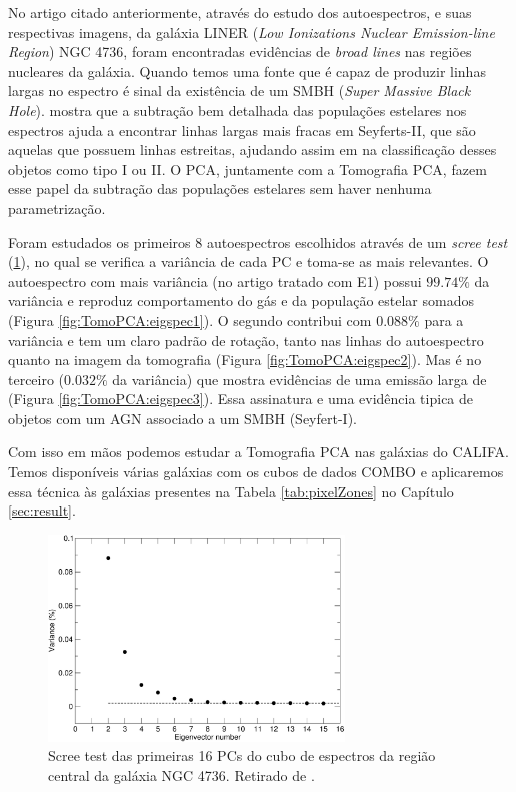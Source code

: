 No artigo citado anteriormente, através do estudo dos autoespectros, e suas
respectivas imagens, da galáxia LINER ({\em Low Ionizations Nuclear
Emission-line Region}) NGC 4736, foram encontradas evidências de {\em broad
lines} nas regiões nucleares da galáxia. Quando temos uma fonte que é capaz de
produzir linhas largas no espectro é sinal da existência de um SMBH ({\em Super
Massive Black Hole}). \citet{CidFernandes2004} mostra que a subtração bem
detalhada das populações estelares nos espectros ajuda a encontrar linhas largas
mais fracas em Seyferts-II, que são aquelas que possuem linhas estreitas,
ajudando assim em na classificação desses objetos como tipo I ou II. O PCA,
juntamente com a Tomografia PCA, fazem esse papel da subtração das populações
estelares sem haver nenhuma parametrização.

Foram estudados os primeiros 8 autoespectros escolhidos através de um {\em scree
test} (\ref{fig:TomoPCA:scree}), no qual se verifica a variância de cada PC e
toma-se as mais relevantes. O autoespectro com mais variância (no artigo tratado
com E1) possui $99.74\%$ da variância e reproduz comportamento do gás e da
população estelar somados (Figura \ref{fig:TomoPCA:eigspec1}). O segundo
contribui com $0.088\%$ para a variância e tem um claro padrão de rotação, tanto
nas linhas do autoespectro quanto na imagem da tomografia (Figura
\ref{fig:TomoPCA:eigspec2}). Mas é no terceiro ($0.032\%$ da variância) que
mostra evidências de uma emissão larga de \Halpha (Figura
\ref{fig:TomoPCA:eigspec3}). Essa assinatura e uma evidência tipica de objetos
com um AGN associado a um SMBH (Seyfert-I).

Com isso em mãos podemos estudar a Tomografia PCA nas galáxias do CALIFA. Temos
disponíveis várias galáxias com os cubos de dados COMBO e aplicaremos essa
técnica às galáxias presentes na Tabela \ref{tab:pixelZones} no Capítulo
\ref{sec:result}.

\begin{figure}
    \includegraphics[width=0.7\textwidth]{figuras/figSteiner2009fig1.pdf}
    \caption[{\em Scree test} na galáxia NGC 4736.]
    {Scree test das primeiras 16 PCs do cubo de espectros da região
    central da galáxia NGC 4736. Retirado de \citet[][fig. 1]{Steiner2009}.}
    \label{fig:TomoPCA:scree}
\end{figure}

